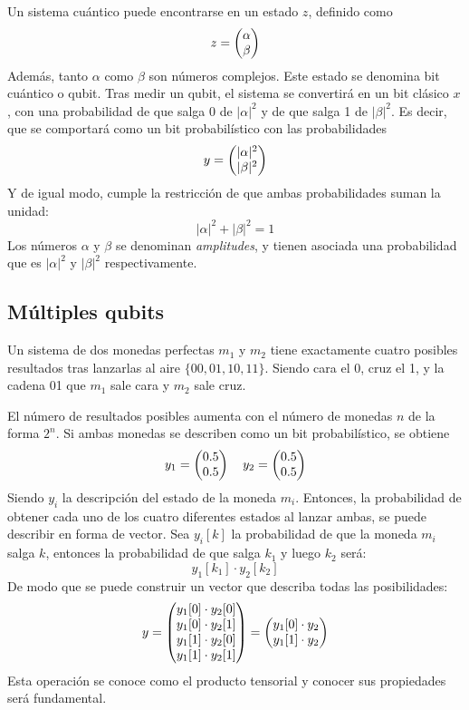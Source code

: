 Un sistema cuántico puede encontrarse en un estado $z$, definido como
%
$$ z = \begin{pmatrix} \alpha \\ \beta \end{pmatrix}$$
%
Además, tanto $\alpha$ como $\beta$ son números complejos. Este estado se 
denomina bit cuántico o qubit.
%
Tras medir un qubit, el sistema se convertirá en un bit clásico $x$, con una 
probabilidad de que salga 0 de $|\alpha|^2$ y de que salga 1 de $|\beta|^2$.
Es decir, que se comportará como un bit probabilístico con las probabilidades
%
$$ y = \begin{pmatrix} |\alpha|^2 \\ |\beta|^2 \end{pmatrix}$$
%
Y de igual modo, cumple la restricción de que ambas probabilidades suman la 
unidad:
%
$$ |\alpha|^2 + |\beta|^2 = 1 $$
%
Los números $\alpha$ y $\beta$ se denominan \textit{amplitudes}, y tienen 
asociada una probabilidad que es $|\alpha|^2$ y $|\beta|^2$ respectivamente.

\subsection{Múltiples qubits}
Un sistema de dos monedas perfectas $m_1$ y $m_2$ tiene exactamente cuatro 
posibles resultados tras lanzarlas al aire $\{00, 01, 10, 11\}$. Siendo cara el 
0, cruz el 1, y la cadena 01 que $m_1$ sale cara y $m_2$ sale cruz.

El número de resultados posibles aumenta con el número de monedas $n$ de la 
forma $2^n$. Si ambas monedas se describen como un bit probabilístico, se 
obtiene
$$ y_1 = \begin{pmatrix} 0.5 \\ 0.5 \end{pmatrix} \quad y_2 = \begin{pmatrix} 0.5 \\ 0.5 \end{pmatrix} $$
Siendo $y_i$ la descripción del estado de la moneda $m_i$. Entonces, la 
probabilidad de obtener cada uno de los cuatro diferentes estados al lanzar 
ambas, se puede describir en forma de vector.
Sea $y_i[k]$ la probabilidad de que la moneda $m_i$ salga $k$, entonces la 
probabilidad de que salga $k_1$ y luego $k_2$ será:
$$ y_1[k_1] \cdot y_2[k_2] $$
De modo que se puede construir un vector que describa todas las posibilidades:
$$ y = \begin{pmatrix} 
	y_1[0] \cdot y_2[0] \\ y_1[0] \cdot y_2[1] \\
	y_1[1] \cdot y_2[0] \\ y_1[1] \cdot y_2[1]
 \end{pmatrix}
= \begin{pmatrix} 
	y_1[0] \cdot y_2 \\
	y_1[1] \cdot y_2
 \end{pmatrix} $$
Esta operación se conoce como el producto tensorial y conocer sus propiedades
será fundamental.

